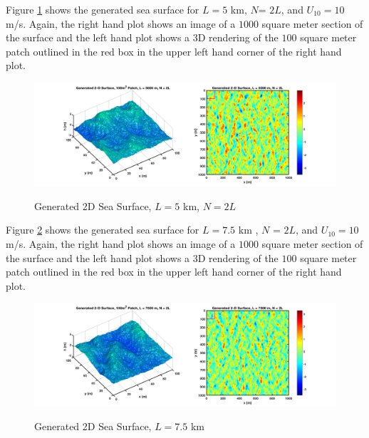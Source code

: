 Figure \ref{os_fig:11} shows the generated sea surface for $L = 5$ km, $N$= $2L$, and $U_{10} = 10$ m/s. Again, the right hand plot shows an image of a $1000$ square meter section of the surface and the left hand plot shows a 3D rendering of the $100$ square meter patch outlined in the red box in the upper left hand corner of the right hand plot.
\begin{figure}[H]
  \begin{center}
\includegraphics[width=6in]{../media/Ocean_Surface/sea_surface_2d_surf_5000.png}
  \end{center}
  \renewcommand{\baselinestretch}{1} \small\normalsize
  \begin{quote}
    \caption[Generated 2D Sea Surface, $L = 5$ km, $N=2L$]{Generated 2D Sea Surface, $L = 5$ km, $N=2L$ \label{os_fig:11}}
  \end{quote}
\end{figure}
\renewcommand{\baselinestretch}{2} \small\normalsize

Figure \ref{os_fig:12} shows the generated sea surface for $L = 7.5$ km , $N$ = $2L$, and $U_{10} = 10$ m/s. Again, the right hand plot shows an image of a $1000$ square meter section of the surface and the left hand plot shows a 3D rendering of the $100$ square meter patch outlined in the red box in the upper left hand corner of the right hand plot.
\begin{figure}[H]
  \begin{center}
\includegraphics[width=6in]{../media/Ocean_Surface/sea_surface_2d_surf_7500.png}
  \end{center}
  \renewcommand{\baselinestretch}{1} \small\normalsize
  \begin{quote}
    \caption[Generated 2D Sea Surface, $L = 7.5$ km]{Generated 2D Sea Surface, $L = 7.5$ km \label{os_fig:12}}
  \end{quote}
\end{figure}
\renewcommand{\baselinestretch}{2} \small\normalsize

